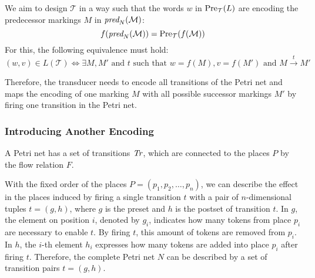 We aim to design $\mathcal{T}$ in a way such that the words $w$ in $\operatorname{\text{Pre}}_{\mathcal{T}}(L)$ are encoding the predecessor markings $M$ in $\operatorname{\textit{pred}}_{N}(\mathcal{M})$:
\begin{equation*}
f(\operatorname{\textit{pred}}_{N}(\mathcal{M})) = \operatorname{\text{Pre}}_{\mathcal{T}}(f(\mathcal{M}))
\end{equation*}
For this, the following equivalence must hold:
\begin{equation*}
(w,v) \in L(\mathcal{T}) \iff \exists M,M' \text{ and } t \text{ such that } w = f(M), v = f(M') \text{ and } M \xrightarrow{t} M' 
\end{equation*}





Therefore, the transducer needs to encode all transitions of the Petri net and maps the encoding of one marking $M$ with all possible successor markings $M'$ by firing one transition in the Petri net.


\subsubsection{Introducing Another Encoding}
A Petri net has a set of transitions $\mathit{Tr}$, which are connected to the places $P$ by the flow relation $F$. 

With the fixed order of the places $P = (p_{1},p_{2},\dots,p_{n})$, we can describe the effect in the places induced by firing a single transition $t$ with a pair of $n$-dimensional tuples $t = (g,h)$, where $g$ is the preset and $h$ is the postset of transition $t$. In $g$, the element on position $i$, denoted by $g_{i}$, indicates how many tokens from place $p_{i}$ are necessary to enable $t$. By firing $t$, this amount of tokens are removed from $p_{i}$. In $h$, the $i$-th element $h_{i}$ expresses how many tokens are added into place $p_{i}$ after firing $t$. Therefore, the complete Petri net $N$ can be described by a set of transition pairs $t = (g,h)$. 

